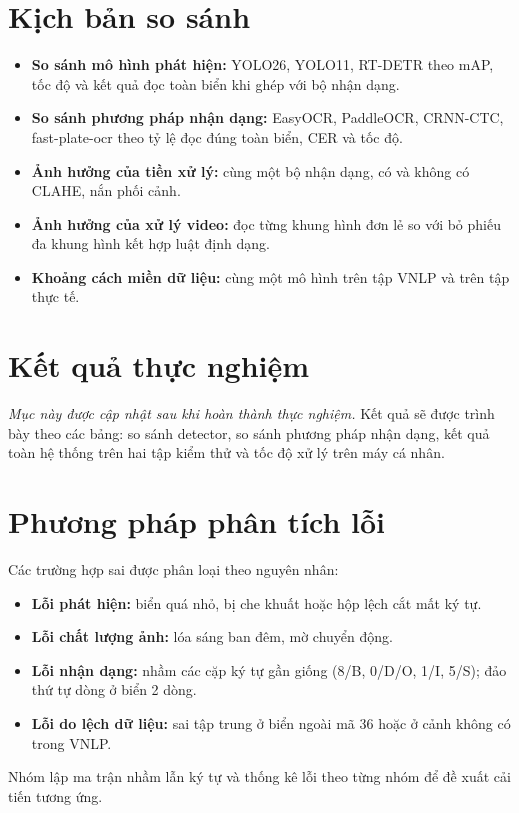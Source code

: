 \section{Kịch bản so sánh}

\begin{itemize}
  \item \textbf{So sánh mô hình phát hiện:} YOLO26, YOLO11, RT-DETR theo mAP, tốc độ và kết quả đọc toàn biển khi ghép với bộ nhận dạng.
  \item \textbf{So sánh phương pháp nhận dạng:} EasyOCR, PaddleOCR, CRNN-CTC, fast-plate-ocr theo tỷ lệ đọc đúng toàn biển, CER và tốc độ.
  \item \textbf{Ảnh hưởng của tiền xử lý:} cùng một bộ nhận dạng, có và không có CLAHE, nắn phối cảnh.
  \item \textbf{Ảnh hưởng của xử lý video:} đọc từng khung hình đơn lẻ so với bỏ phiếu đa khung hình kết hợp luật định dạng.
  \item \textbf{Khoảng cách miền dữ liệu:} cùng một mô hình trên tập VNLP và trên tập thực tế.
\end{itemize}

\section{Kết quả thực nghiệm}

\textit{Mục này được cập nhật sau khi hoàn thành thực nghiệm.} Kết quả sẽ được trình bày theo các bảng: so sánh detector, so sánh phương pháp nhận dạng, kết quả toàn hệ thống trên hai tập kiểm thử và tốc độ xử lý trên máy cá nhân.

\section{Phương pháp phân tích lỗi}

Các trường hợp sai được phân loại theo nguyên nhân:
\begin{itemize}
  \item \textbf{Lỗi phát hiện:} biển quá nhỏ, bị che khuất hoặc hộp lệch cắt mất ký tự.
  \item \textbf{Lỗi chất lượng ảnh:} lóa sáng ban đêm, mờ chuyển động.
  \item \textbf{Lỗi nhận dạng:} nhầm các cặp ký tự gần giống (8/B, 0/D/O, 1/I, 5/S); đảo thứ tự dòng ở biển 2 dòng.
  \item \textbf{Lỗi do lệch dữ liệu:} sai tập trung ở biển ngoài mã 36 hoặc ở cảnh không có trong VNLP.
\end{itemize}

Nhóm lập ma trận nhầm lẫn ký tự và thống kê lỗi theo từng nhóm để đề xuất cải tiến tương ứng.
